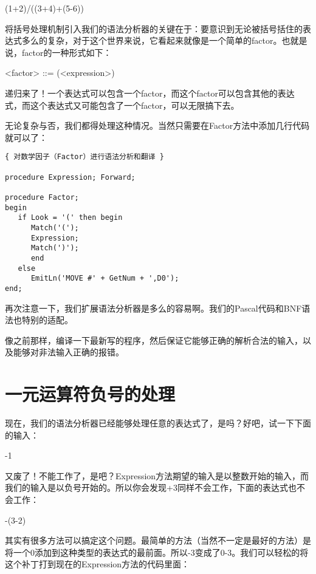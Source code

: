 \begin{tcolorbox}
(1+2)/((3+4)+(5-6))
\end{tcolorbox}

将括号处理机制引入我们的语法分析器的关键在于：要意识到无论被括号括住的表达式多么的复杂，对于这个世界来说，它看起来就像是一个简单的factor。也就是说，factor的一种形式如下：

\begin{tcolorbox}
<factor> ::= (<expression>)
\end{tcolorbox}

递归来了！一个表达式可以包含一个factor，而这个factor可以包含其他的表达式，而这个表达式又可能包含了一个factor，可以无限搞下去。

无论复杂与否，我们都得处理这种情况。当然只需要在Factor方法中添加几行代码就可以了：                             

\begin{verbatim}
{ 对数学因子（Factor）进行语法分析和翻译 }

procedure Expression; Forward;

procedure Factor;
begin
   if Look = '(' then begin
      Match('(');
      Expression;
      Match(')');
      end
   else
      EmitLn('MOVE #' + GetNum + ',D0');
end;
\end{verbatim}

再次注意一下，我们扩展语法分析器是多么的容易啊。我们的Pascal代码和BNF语法也特别的适配。

像之前那样，编译一下最新写的程序，然后保证它能够正确的解析合法的输入，以及能够对非法输入正确的报错。

\section{一元运算符负号的处理}

现在，我们的语法分析器已经能够处理任意的表达式了，是吗？好吧，试一下下面的输入：

\begin{tcolorbox}
-1
\end{tcolorbox}

又废了！不能工作了，是吧？Expression方法期望的输入是以整数开始的输入，而我们的输入是以负号开始的。所以你会发现+3同样不会工作，下面的表达式也不会工作：

\begin{tcolorbox}
-(3-2)
\end{tcolorbox}

其实有很多方法可以搞定这个问题。最简单的方法（当然不一定是最好的方法）是将一个0添加到这种类型的表达式的最前面。所以-3变成了0-3。我们可以轻松的将这个补丁打到现在的Expression方法的代码里面：

